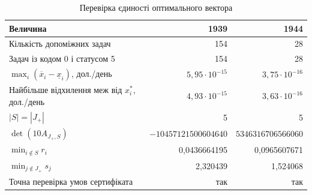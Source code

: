 \begin{table}[htbp]
\centering\small
\caption{Перевірка єдиності оптимального вектора}
\label{tab:glpk-uniqueness}
\begin{tabular}{lrr}
\toprule
Величина & 1939 & 1944 \\
\midrule
Кількість допоміжних задач & 154 & 28 \\
Задач із кодом 0 і статусом 5 & 154 & 28 \\
$\max_i(\overline x_i-\underline x_i)$, дол./день & $5{,}95\cdot10^{-15}$ & $3{,}75\cdot10^{-16}$ \\
Найбільше відхилення меж від $x_i^*$, дол./день & $4{,}93\cdot10^{-15}$ & $3{,}63\cdot10^{-16}$ \\
$|S|=|J_+|$ & 5 & 5 \\
$\det(10A_{J_+,S})$ & $-10457121500604640$ & $5346316706566060$ \\
$\min_{i\notin S}r_i$ & 0{,}0436664195 & 0{,}0965607671 \\
$\min_{j\notin J_+}s_j$ & 2{,}320439 & 1{,}524068 \\
Точна перевірка умов сертифіката & так & так \\
\bottomrule
\end{tabular}
\end{table}
